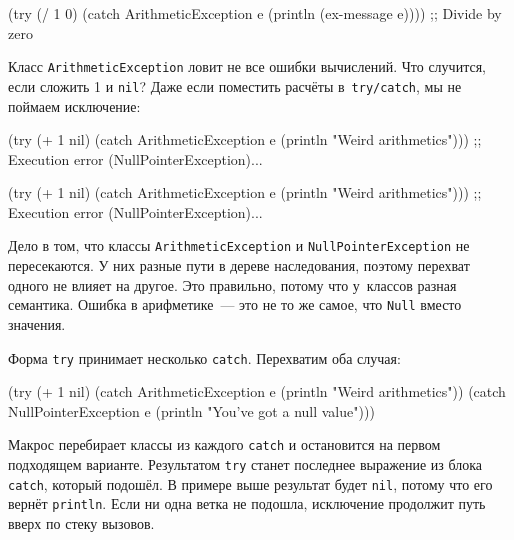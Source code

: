 \begin{english}
  \begin{clojure}
(try
  (/ 1 0)
  (catch ArithmeticException e
    (println (ex-message e))))
;; Divide by zero
  \end{clojure}
\end{english}

Класс \verb|ArithmeticException| ловит не все ошибки вычислений. Что случится,
если сложить 1 и \verb|nil|? Даже если поместить расчёты в~\verb|try/catch|,
мы не поймаем исключение:

\ifx\devicetype\mobile

\begin{english}
  \begin{clojure}
(try
  (+ 1 nil)
  (catch ArithmeticException e
    (println "Weird arithmetics")))
;; Execution error
          (NullPointerException)...
  \end{clojure}
\end{english}

\else

\begin{english}
  \begin{clojure}
(try
  (+ 1 nil)
  (catch ArithmeticException e
    (println "Weird arithmetics")))
;; Execution error (NullPointerException)...
  \end{clojure}
\end{english}

\fi


\noindent
Дело в том, что классы \verb|ArithmeticException| и
\verb|NullPointerException| не пересекаются. У них разные пути в дереве
наследования, поэтому перехват одного не влияет на другое. Это правильно, потому
что у~классов разная семантика. Ошибка в арифметике~--- это не то же самое, что
\verb|Null| вместо значения.


Форма \verb|try| принимает несколько \verb|catch|. Перехватим оба случая:

\begin{english}
  \begin{clojure}
(try
  (+ 1 nil)
  (catch ArithmeticException e
    (println "Weird arithmetics"))
  (catch NullPointerException e
    (println "You've got a null value")))
  \end{clojure}
\end{english}

Макрос перебирает классы из каждого \verb|catch| и остановится на первом
подходящем варианте. Результатом \verb|try| станет последнее выражение из
блока \verb|catch|, который подошёл. В примере выше результат будет
\verb|nil|, потому что его вернёт \verb|println|. Если ни одна ветка не
подошла, исключение продолжит путь вверх по стеку вызовов.

